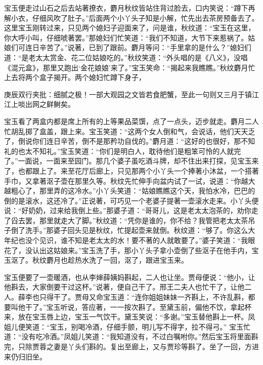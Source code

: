 \begin{parag}


    宝玉便走过山石之后去站著撩衣，麝月秋纹皆站住背过脸去，口内笑说：“蹲下再解小衣，仔细风吹了肚子。”后面两个小丫头子知是小解，忙先出去茶房预备去了。这里宝玉刚转过来，只见两个媳妇子迎面来了，问是谁，秋纹道：“宝玉在这里，你大呼小叫，仔细唬著罢。”那媳妇们忙笑道：“我们不知道，大节下来惹祸了。姑娘们可连日辛苦了。”说著，已到了跟前。麝月等问：“手里拿的是什么？”媳妇们道：“是老太太赏金、花二位姑娘吃的。”秋纹笑道：“外头唱的是《八义》，没唱《混元盒》，那里又跑出‘金花娘娘’来了。”宝玉笑命：“揭起来我瞧瞧。”秋纹麝月忙上去将两个盒子揭开。两个媳妇忙蹲下身子，\begin{note}庚辰双行夹批：细腻之极！一部大观园之文皆若食肥蟹，至此一句则又三月于镇江江上啖出网之鲜鲥矣。\end{note}宝玉看了两盒内都是席上所有的上等果品菜馔，点了一点头，迈步就走。麝月二人忙胡乱掷了盒盖，跟上来。宝玉笑道：“这两个女人倒和气，会说话，他们天天乏了，倒说你们连日辛苦，倒不是那矜功自伐的。”麝月道：“这好的也很好，那不知礼的也太不知礼。”宝玉笑道：“你们是明白人，耽待他们是粗笨可怜的人就完了。”一面说，一面来至园门。那几个婆子虽吃酒斗牌，却不住出来打探，见宝玉来了，也都跟上了。来至花厅后廊上，只见那两个小丫头一个捧著小沐盆，一个搭著手巾，又拿著沤子壶在那里久等。秋纹先忙伸手向盆内试了一试，说道：“你越大越粗心了，那里弄的这冷水。”小丫头笑道：“姑娘瞧瞧这个天，我怕水冷，巴巴的倒的是滚水，这还冷了。”正说著，可巧见一个老婆子提著一壶滚水走来。小丫头便说：“好奶奶，过来给我倒上些。”那婆子道：“哥哥儿，这是老太太泡茶的，劝你走了舀去罢，那里就走大了脚。”秋纹道：“凭你是谁的，你不给？我管把老太太茶吊子倒了洗手。”那婆子回头见是秋纹，忙提起壶来就倒。秋纹道：“够了。你这么大年纪也没个见识，谁不知是老太太的水！要不著的人就敢要了。”婆子笑道：“我眼花了，没认出这姑娘来。”宝玉洗了手，那小丫头子拿小壶倒了些沤子在他手内，宝玉沤了。秋纹麝月也趁热水洗了一回，沤了，跟进宝玉来。
\end{parag}


\begin{parag}


    宝玉便要了一壶暖酒，也从李婶薛姨妈斟起，二人也让坐。贾母便说：“他小，让他斟去，大家倒要干过这杯。”说著，便自己干了。邢王二夫人也忙干了，让他二人。薛李也只得干了。贾母又命宝玉道：“连你姐姐妹妹一齐斟上，不许乱斟，都要叫他干了。”宝玉听说，答应著，一一按次斟了。至黛玉前，偏他不饮，拿起杯来，放在宝玉唇上边，宝玉一气饮干。黛玉笑说：“多谢。”宝玉替他斟上一杯。凤姐儿便笑道：“宝玉，别喝冷酒，仔细手颤，明儿写不得字，拉不得弓。” 宝玉忙道：“没有吃冷酒。”凤姐儿笑道：“我知道没有，不过白嘱咐你。”然后宝玉将里面斟完，只除贾蓉之妻是丫头们斟的。复出至廊上，又与贾珍等斟了。坐了一回，方进来仍归旧坐。
\end{parag}


